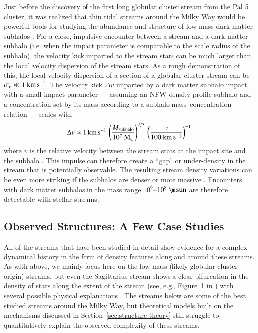 \documentclass[final,5p,times,twocolumn,authoryear]{elsarticle}
\begin{document}
Just before the discovery of the first long globular cluster stream from the Pal 5
cluster, it was realized that thin tidal streams around the Milky Way would be powerful
tools for studying the abundance and structure of low-mass dark matter subhalos
\citep{ibata:2002,johnston:2002}.
For a close, impulsive encounter between a stream and a dark matter subhalo (i.e. when
the impact parameter is comparable to the scale radius of the subhalo), the velocity
kick imparted to the stream stars can be much larger than the local velocity dispersion
of the stream stars.
As a rough demonstration of this, the local velocity dispersion of a section of a
globular cluster stream can be $\sigma_v \ll 1~\kms$.
The velocity kick $\Delta v$ imparted by a dark matter subhalo impact with a small
impact parameter --- assuming an NFW density profile subhalo and a concentration set by
its mass according to a subhalo mass--concentration relation \citep{moline:2017} ---
scales with
\begin{equation}
    \Delta v \approx 1~\kms \,
        \left(\frac{M_{\rm subhalo}}{10^7~{\rm M}_\odot}\right)^{2/3}\,
        \left(\frac{v}{100~{\rm km}~{\rm s}^{-1}}\right)^{-1}
\end{equation}
where $v$ is the relative velocity between the stream stars at the impact site and the
subhalo \citep[see also][]{erkal:2015a, sanders:2016}.
This impulse can therefore create a ``gap'' or under-density in the stream that is
potentially observable.
The resulting stream density variations can be even more striking if the subhalos are
denser or more massive \citep[see, e.g.,][]{yoon:2011, bonaca:2014}.
Encounters with dark matter subhalos in the mass range $10^6$--$10^8~\unit{\msun}$ are
therefore detectable with stellar streams.


\subsection{Observed Structures: A Few Case Studies}
\label{sec:structure-obs}

All of the streams that have been studied in detail show evidence for a complex
dynamical history in the form of density features along and around these streams.
As with above, we mainly focus here on the low-mass (likely globular-cluster origin)
streams, but even the Sagittarius stream shows a clear bifurcation in the density of
stars along the extent of the stream (see, e.g., Figure~1 in \citealt{belokurov:2006})
with several possible physical explanations \citep[e.g.,][]{penarrubia:2010,
vasiliev:2020, vasiliev:2021}.
The streams below are some of the best studied streams around the Milky Way, but
theoretical models built on the mechanisms discussed in
Section~\ref{sec:structure-theory} still struggle to quantitatively explain the observed
complexity of these streams.
\end{document}
